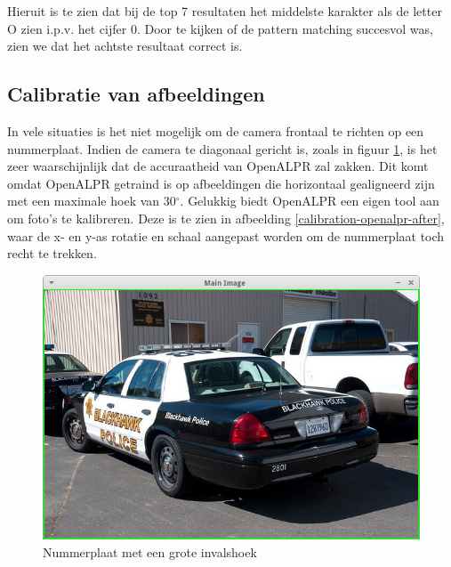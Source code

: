 Hieruit is te zien dat bij de top 7 resultaten het middelste karakter als de letter O zien i.p.v. het cijfer 0. Door te kijken of de pattern matching succesvol was, zien we dat het achtste resultaat correct is.

\subsection{Calibratie van afbeeldingen}
\label{alprcalib}
In vele situaties is het niet mogelijk om de camera frontaal te richten op een nummerplaat. Indien de camera te diagonaal gericht is, zoals in figuur \ref{calibration-openalpr}, is het zeer waarschijnlijk dat de accuraatheid van OpenALPR zal zakken. Dit komt omdat OpenALPR getraind is op afbeeldingen die horizontaal gealigneerd zijn met een maximale hoek van 30$^{\circ}$. Gelukkig biedt OpenALPR een eigen tool aan om foto's te kalibreren. Deze is te zien in afbeelding \ref{calibration-openalpr-after}, waar de x- en y-as rotatie en schaal aangepast worden om de nummerplaat toch recht te trekken.

\begin{figure}[h!]
	\centering
	\includegraphics[width=0.7\linewidth]{img/calibration/configuration_calibration_before.jpg}
	\caption{Nummerplaat met een grote invalshoek \autocite{openalpr2015pattern}}
	\label{calibration-openalpr}
\end{figure}

